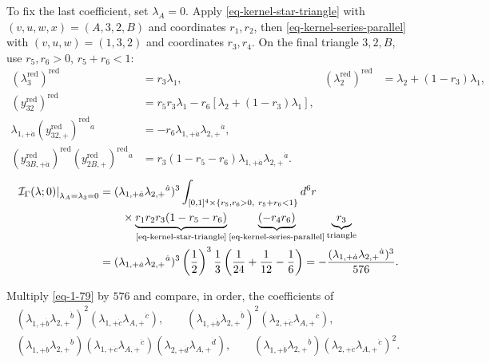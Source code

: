 \documentclass[11pt]{article}
\numberwithin{equation}{section}
\numberwithin{figure}{section}
\numberwithin{table}{section}
\begin{document}
\begin{proofbox}
To fix the last coefficient, set $\lambda_A=0$. Apply \eqref{eq-kernel-star-triangle} with $(v,u,w,x)=(A,3,2,B)$ and coordinates $r_1,r_2$, then \eqref{eq-kernel-series-parallel} with $(v,u,w)=(1,3,2)$ and coordinates $r_3,r_4$. On the final triangle $3,2,B$, use $r_5,r_6>0$, $r_5+r_6< 1$:
\begin{equation*}
\begin{aligned}
(\lambda_3^{\mathrm{red}})^{\mathrm{red}}&=r_3\lambda_1,&
(\lambda_2^{\mathrm{red}})^{\mathrm{red}}&=\lambda_2+(1-r_3)\lambda_1,\\
(y_{32}^{\mathrm{red}})^{\mathrm{red}}
&=r_5r_3\lambda_1-r_6[\lambda_2+(1-r_3)\lambda_1],\\
\lambda_{1,+\dot a}(y_{32,+}^{\mathrm{red}})^{\mathrm{red}}{}^{\dot a}
&=-r_6\lambda_{1,+\dot a}\lambda_{2,+}{}^{\dot a},\\
(y_{3B,+\dot a}^{\mathrm{red}})^{\mathrm{red}}
(y_{2B,+}^{\mathrm{red}})^{\mathrm{red}}{}^{\dot a}
&=r_3(1-r_5-r_6)\lambda_{1,+\dot a}\lambda_{2,+}{}^{\dot a}.
\end{aligned}
\end{equation*}
\begin{equation*}
\begin{aligned}
\left.\mathcal I_\Gamma(\lambda;0)\right|_{\lambda_A=\lambda_3=0}
&=(\lambda_{1,+\dot a}\lambda_{2,+}{}^{\dot a})^3
\int_{[0,1]^4\times\{r_5,r_6>0,\ r_5+r_6<1\}}
d^6r\\
&\qquad\times\underbrace{r_1r_2r_3(1-r_5-r_6)}_{\text{\eqref{eq-kernel-star-triangle}}}
\underbrace{(-r_4r_6)}_{\text{\eqref{eq-kernel-series-parallel}}}
\underbrace{r_3}_{\text{triangle}}\\
&=(\lambda_{1,+\dot a}\lambda_{2,+}{}^{\dot a})^3
\left(\frac12\right)^3\frac13\left(\frac1{24}+\frac1{12}-\frac16\right)
=-\frac{(\lambda_{1,+\dot a}\lambda_{2,+}{}^{\dot a})^3}{576}.
\end{aligned}
\end{equation*}

Multiply \eqref{eq-1-79} by $576$ and compare, in order, the coefficients of
\begin{equation*}
\begin{gathered}
(\lambda_{1,+\dot b}\lambda_{2,+}{}^{\dot b})^2(\lambda_{1,+\dot c}\lambda_{A,+}{}^{\dot c}),\qquad
(\lambda_{1,+\dot b}\lambda_{2,+}{}^{\dot b})^2(\lambda_{2,+\dot c}\lambda_{A,+}{}^{\dot c}),\\
(\lambda_{1,+\dot b}\lambda_{2,+}{}^{\dot b})(\lambda_{1,+\dot c}\lambda_{A,+}{}^{\dot c})(\lambda_{2,+\dot d}\lambda_{A,+}{}^{\dot d}),\qquad
(\lambda_{1,+\dot b}\lambda_{2,+}{}^{\dot b})(\lambda_{2,+\dot c}\lambda_{A,+}{}^{\dot c})^2.
\end{gathered}
\end{equation*}


\end{proofbox}
\end{document}
